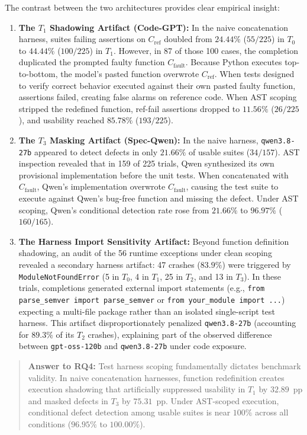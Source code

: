 \documentclass[11pt,a4paper]{article}
\begin{document}
The contrast between the two architectures provides clear empirical insight:
\begin{enumerate}
    \item \textbf{The $T_1$ Shadowing Artifact (Code-GPT):} In the naive concatenation harness, suites failing assertions on $C_{\text{ref}}$ doubled from $24.44\%$ ($55/225$) in $T_0$ to $44.44\%$ ($100/225$) in $T_1$. However, in 87 of those 100 cases, the completion duplicated the prompted faulty function $C_{\text{fault}}$. Because Python executes top-to-bottom, the model's pasted function overwrote $C_{\text{ref}}$. When tests designed to verify correct behavior executed against their own pasted faulty function, assertions failed, creating false alarms on reference code. When AST scoping stripped the redefined function, ref-fail assertions dropped to $11.56\%$ ($26/225$), and usability reached $85.78\%$ ($193/225$).
    \item \textbf{The $T_3$ Masking Artifact (Spec-Qwen):} In the naive harness, \texttt{qwen3.8-27b} appeared to detect defects in only $21.66\%$ of usable suites ($34/157$). AST inspection revealed that in 159 of 225 trials, Qwen synthesized its own provisional implementation before the unit tests. When concatenated with $C_{\text{fault}}$, Qwen's implementation overwrote $C_{\text{fault}}$, causing the test suite to execute against Qwen's bug-free function and missing the defect. Under AST scoping, Qwen's conditional detection rate rose from $21.66\%$ to $96.97\%$ ($160/165$).
    \item \textbf{The Harness Import Sensitivity Artifact:} Beyond function definition shadowing, an audit of the 56 runtime exceptions under clean scoping revealed a secondary harness artifact: 47 crashes ($83.9\%$) were triggered by \texttt{ModuleNotFoundError} (5 in $T_0$, 4 in $T_1$, 25 in $T_2$, and 13 in $T_3$). In these trials, completions generated external import statements (e.g., \texttt{from parse\_semver import parse\_semver} or \texttt{from your\_module import ...}) expecting a multi-file package rather than an isolated single-script test harness. This artifact disproportionately penalized \texttt{qwen3.8-27b} (accounting for $89.3\%$ of its $T_2$ crashes), explaining part of the observed difference between \texttt{gpt-oss-120b} and \texttt{qwen3.8-27b} under code exposure.
\end{enumerate}

\begin{quote}
\textbf{Answer to RQ4:} Test harness scoping fundamentally dictates benchmark validity. In naive concatenation harnesses, function redefinition creates execution shadowing that artificially suppressed usability in $T_1$ by $32.89$~pp and masked defects in $T_3$ by $75.31$~pp. Under AST-scoped execution, conditional defect detection among usable suites is near $100\%$ across all conditions ($96.95\%$ to $100.00\%$).
\end{quote}
\end{document}
